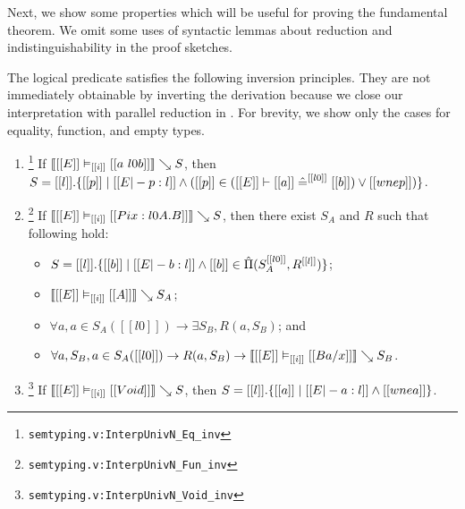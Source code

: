 \documentclass[acmsmall, screen=true, nonacm=true,
  review=\ifpublic false\else true\fi,
  anonymous=\ifanonymous true\else false\fi
]{acmart}
\DeclarePairedDelimiter{\bracks}{\llbracket}{\rrbracket}
\DeclarePairedDelimiter{\braces}{\lbrace}{\rbrace}
\newcommand{\suppl}[3]{{\scriptsize\texttt{#2:#3}}}
\newcommand{\interp}[4]{\bracks{#1 \vDash_{#2} #3} \searrow #4}
\newcommand{\buildset}[3]{#2 . \braces{#1 \mid #3}}
\newcommand{\member}[3]{#1 \in #3(#2)}
\newcommand{\prodspace}[5]{#1 \in \hat{\Pi}(#2^{#3}, #4^{#5})}
\newcommand{\eqspace}[5]{#1 \in (#2 \vdash #3 \mathrel{\hat{=}}^{#5} #4)}
\newlength{\punctwidth}
\newcommand{\stack}[1]{%
  \settowidth{\punctwidth}{#1}%
  \hspace*{-\the\punctwidth}%
}
\begin{document}

Next, we show some properties which will be useful for proving the fundamental theorem.
We omit some uses of syntactic lemmas about reduction and indistinguishability
in the proof sketches.

The logical predicate satisfies the following inversion principles.
They are not immediately obtainable by inverting
the derivation because we close our interpretation with parallel
reduction in . For brevity, we show only the cases
for equality, function, and empty types.

\begin{lemma}
  \label{lem:interpinv}\leavevmode
  \begin{enumerate}
  \item \stack{~}\footnote{\suppl{theories}{semtyping.v}{InterpUnivN\_Eq\_inv}}
    \label{lem:interpinveq}
    If $\interp{[[E]]}{[[i]]}{[[a ~ l0 b]]}{S}$, then $S =
    \buildset{[[p]]}{[[l]]}{[[E |- p : l]] \wedge
      (\eqspace{[[p]]}{[[E]]}{[[a]]}{[[b]]}{[[l0]]} \vee [[wne p]])}$.
  \item \stack{~}\footnote{\suppl{theories}{semtyping.v}{InterpUnivN\_Fun\_inv}}
    \label{lem:interpinvfun}
    If $\interp{[[E]]}{[[i]]}{[[Pi x : l0 A . B]]}{S}$, then there
    exist $S_A$ and $R$ such that following hold:
    \begin{itemize}
    \item $S = \buildset{[[b]]}{[[l]]}{[[E |- b : l]] \wedge \prodspace{[[b]]}{S_A}{[[l0]]}{R}{[[l]]}}$;
    \item $\interp{[[E]]}{[[i]]}{[[A]]}{S_A}$;
    \item $\forall a, \member{a}{[[l0]]}{S_A} \to \exists S_B, R(a,
      S_B)$; and
    \item $\forall a, S_B, \member{a}{[[l0]]}{S_A} \to R(a, S_B) \to
      \interp{[[E]]}{[[i]]}{[[B {a / x}]]}{S_B}$.
    \end{itemize}
  \item \stack{~}\footnote{\suppl{theories}{semtyping.v}{InterpUnivN\_Void\_inv}}
    \label{lem:interpinvvoid}
    If $\interp{[[E]]}{[[i]]}{[[Void]]}{S}$, then $S =
    \buildset{[[a]]}{[[l]]}{[[E |- a : l]] \wedge [[wne a]]}$.
  \end{enumerate}
\end{lemma}
\end{document}

